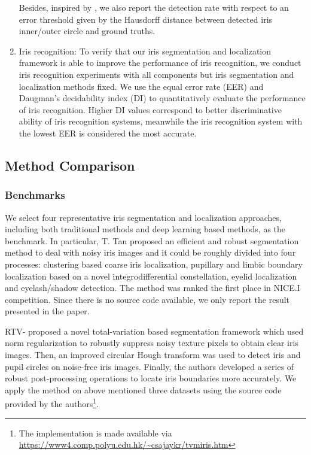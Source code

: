 \documentclass[journal]{IEEEtran}
\begin{document}
\begin{enumerate}
      \quad Besides, inspired by \cite{fuhl2016evaluation}, we also report the detection rate with respect to an error threshold given by the Hausdorff distance between detected iris inner/outer circle and ground truths.
  \item Iris recognition: To verify that our iris segmentation and localization framework is able to improve the performance of iris recognition, we conduct iris recognition experiments with all components but iris segmentation and localization methods fixed. We use the equal error rate (EER) and Daugman's decidability index (DI)\cite{Daugman_id} to quantitatively evaluate the performance of iris recognition. Higher DI values correspond to better discriminative ability of iris recognition systems, meanwhile the iris recognition system with the lowest EER is considered the most accurate.
\end{enumerate}

\subsection{Method Comparison}
\subsubsection{Benchmarks}
We select four representative iris segmentation and localization approaches, including both traditional methods and deep learning based methods, as the benchmark.
In particular, T. Tan \etal\cite{tan2010efficient} proposed an efficient and robust segmentation method to deal with noisy iris images and it could be roughly divided into four processes: clustering based coarse iris localization, pupillary and limbic boundary localization based on a novel integrodifferential
constellation, eyelid localization and eyelash/shadow detection.
The method was ranked the first place in NICE.I competition\cite{nice1}. Since there is no source code available, we only report the result presented in the paper.

RTV-\cite{Zhao2015An} proposed a novel total-variation based segmentation framework which used  norm regularization to robustly suppress noisy texture pixels to obtain clear iris images. Then, an improved circular Hough transform was used to detect iris and pupil circles on noise-free iris images.
Finally, the authors developed a series of robust post-processing operations to locate iris boundaries more accurately.
We apply the method on above mentioned three datasets using the source code provided by the authors\footnote{The implementation is made available via \url{https://www4.comp.polyu.edu.hk/~csajaykr/tvmiris.htm}}.
\end{document}
